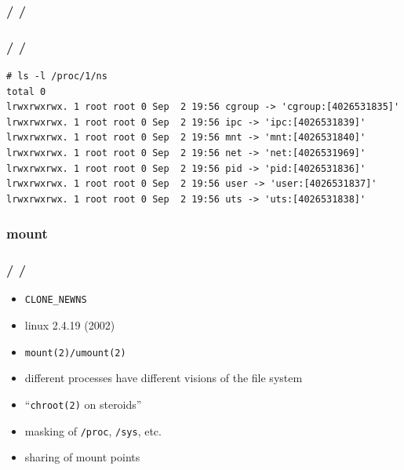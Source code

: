 \documentclass{beamer}
\newcommand{\autotitle}
{\frametitle{
    \secname
    \ifx\insertsubsection\empty
    \else
        /\subsecname
        \ifx\insertsubsubsection\empty\else/\subsubsecname\fi
    \fi}}
\begin{document}
\begin{frame}
    \autotitle
    \begin{itemize}
    \end{itemize}
\end{frame}

\begin{frame}[fragile]
    \autotitle
    \footnotesize
    \begin{verbatim}
# ls -l /proc/1/ns
total 0
lrwxrwxrwx. 1 root root 0 Sep  2 19:56 cgroup -> 'cgroup:[4026531835]'
lrwxrwxrwx. 1 root root 0 Sep  2 19:56 ipc -> 'ipc:[4026531839]'
lrwxrwxrwx. 1 root root 0 Sep  2 19:56 mnt -> 'mnt:[4026531840]'
lrwxrwxrwx. 1 root root 0 Sep  2 19:56 net -> 'net:[4026531969]'
lrwxrwxrwx. 1 root root 0 Sep  2 19:56 pid -> 'pid:[4026531836]'
lrwxrwxrwx. 1 root root 0 Sep  2 19:56 user -> 'user:[4026531837]'
lrwxrwxrwx. 1 root root 0 Sep  2 19:56 uts -> 'uts:[4026531838]'
    \end{verbatim}
\end{frame}

\subsubsection{mount}

\begin{frame}
    \autotitle
    \begin{itemize}
        \item \texttt{CLONE\_NEWNS}
        \item linux 2.4.19 (2002)
        \item \texttt{mount(2)/umount(2)}
        \item different processes have different visions of the file system
        \item ``\texttt{chroot(2)} on steroids''
        \item masking of \texttt{/proc}, \texttt{/sys}, etc.
        \item sharing of mount points
    \end{itemize}
\end{frame}
\end{document}

